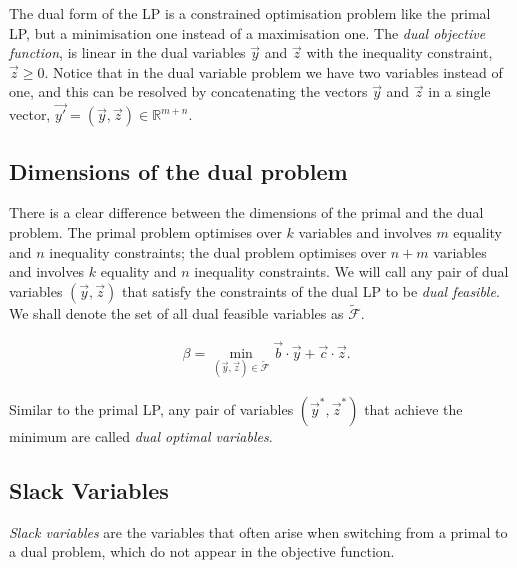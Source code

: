 The dual form of the LP is a constrained optimisation problem like the primal LP, but a minimisation one instead of a maximisation one.
The \textit{dual objective function}, is linear in the dual variables $\vec{y}$ and $\vec{z}$ with the inequality constraint, $\vec{z} \ge 0$. Notice that in the dual variable problem we have two variables instead of one, and this can be resolved by concatenating the vectors $\vec{y}$ and $\vec{z}$ in a single vector,
$\vec{y'} = (\vec{y}, \vec{z}) \in \mathbb{R}^{m+n}.$

\subsection{Dimensions of the dual problem}
There is a clear difference between the dimensions of the primal and the dual problem. The primal problem optimises over $k$ variables and involves $m$ equality and $n$ inequality constraints; the dual problem optimises over $n+m$ variables and involves $k$ equality and $n$ inequality constraints.
We will call any pair of dual variables $(\vec{y}, \vec{z})$ that satisfy the constraints of the dual LP to be \textit{dual feasible}. We shall denote the set of all dual feasible variables as $\tilde{\mathcal{F}}$.

\begin{align}
     & \beta = \min_{(\vec{y},  \vec{z}) \in \tilde{\mathcal{F}}} \vec{b} \cdot \vec{y} + \vec{c} \cdot \vec{z}.
\end{align}

Similar to the primal LP, any pair of variables $(\vec{y}^{*}, \vec{z}^{*})$ that achieve the minimum are called \textit{dual optimal variables}.


\subsection{Slack Variables}
\textit{Slack variables} are the variables that often arise when switching from a primal to a dual problem, which do not appear in the objective function.


